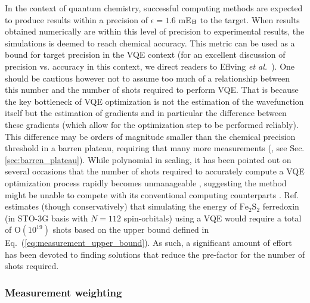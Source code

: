 In the context of quantum chemistry, successful computing methods are expected to produce results within a precision of $\epsilon = 1.6$ mE$_{\rm H}$ \cite{Peterson2012} to the target. When results obtained numerically are within this level of precision to experimental results, the simulations is deemed to reach chemical accuracy. This metric can be used as a bound for target precision in the VQE context (for an excellent discussion of precision vs. accuracy in this context, we direct readers to Eflving {\it et al.}~\cite{Elfving2020}). One should be cautious however not to assume too much of a relationship between this number and the number of shots required to perform VQE. That is because the key bottleneck of VQE optimization is not the estimation of the wavefunction itself but the estimation of gradients and in particular the difference between these gradients (which allow for the optimization step to be performed reliably). This difference may be orders of magnitude smaller than the chemical precision threshold in a barren plateau, requiring that many more measurements (\cite{McClean2018}, see Sec. \ref{sec:barren_plateau}). 
While polynomial in scaling, it has been pointed out on several occasions that the number of shots required to accurately compute a VQE optimization process rapidly becomes unmanageable \cite{Elfving2020, Wecker2015, Gonthier2020}, suggesting the method might be unable to compete with its conventional computing counterparts \cite{Elfving2020}. Ref. \cite{Wecker2015} estimates (though conservatively) that simulating the energy of $\mathrm{Fe_2S_2}$ ferredoxin (in STO-3G basis with $N=112$ spin-orbitals) using a VQE would require a total of $\mathrm{O}(10^{19})$ shots based on the upper bound defined in Eq.~(\ref{eq:measurement_upper_bound}). As such, a significant amount of effort has been devoted to finding solutions that reduce the pre-factor for the number of shots required. 

\subsubsection{Measurement weighting}

